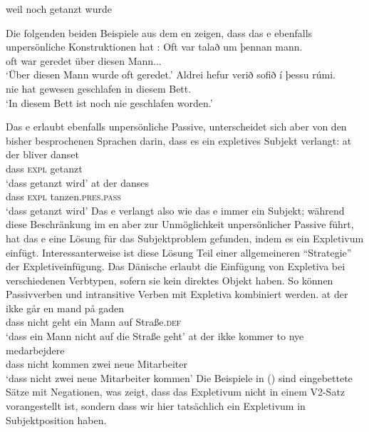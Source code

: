 \ea
weil    noch  getanzt wurde
\z

\noindent
Die folgenden beiden Beispiele aus dem en zeigen, dass das e ebenfalls unpersönliche Konstruktionen hat \citep[]{Thrainsson2007a-u}:
\eal
\ex 
\gll Oft var   talað      um   þennan mann.\\
     oft war geredet über diesen Mann.\ACC.\SG.\M\\\icelandic
\glt `Über diesen Mann wurde oft geredet.'
\ex
\gll Aldrei hefur verið    sofið      í  þessu  rúmi.\\
     nie hat gewesen geschlafen in diesem Bett.\DAT\\
\glt `In diesem Bett ist noch nie geschlafen worden.'
\zl

\noindent
Das e erlaubt ebenfalls unpersönliche Passive, unterscheidet sich aber von den bisher besprochenen Sprachen darin, dass es ein expletives Subjekt verlangt:
\eal
\ex\label{ex-at-der-bliver-danset} 
\gll at der bliver danset\\
     dass \textsc{expl} \AUX{} getanzt\\\danish
\glt `dass getanzt wird'
\ex
\gll at der danses\\
     dass \textsc{expl} tanzen.\textsc{pres}.\textsc{pass}\\
\glt `dass getanzt wird'
\zl
Das e verlangt also wie das e immer ein Subjekt; während diese Beschränkung im en aber zur
Unmöglichkeit unpersönlicher Passive führt, hat das e eine Lösung für das Subjektproblem gefunden, indem es
ein Expletivum einfügt. Interessanterweise ist diese Lösung Teil einer allgemeineren "`Strategie"' der
Expletiveinfügung. Das Dänische erlaubt die Einfügung von Expletiva bei verschiedenen Verbtypen, sofern
sie kein direktes Objekt haben. So können Passivverben und intransitive Verben mit
Expletiva kombiniert werden.
\eal
\ex 
\gll at    der    ikke går   en mand på gaden\\
     dass \expl{} nicht geht ein Mann auf Straße.\textsc{def}\\\danish
\glt `dass ein Mann nicht auf die Straße geht'
\ex 
\gll at   der     ikke kommer to  nye medarbejdere\\
     dass \expl{} nicht kommen zwei neue Mitarbeiter\\
\glt `dass nicht zwei neue Mitarbeiter kommen'
\zl
Die Beispiele in () sind eingebettete Sätze mit Negationen, was zeigt, dass das Expletivum nicht
in einem V2-Satz vorangestellt ist, sondern dass wir hier tatsächlich ein Expletivum in Subjektposition haben.

